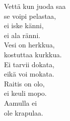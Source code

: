 
            Vettä kun juoda saa \\
            se voipi pelastaa, \\
            ei iske känni, \\
            ei ala ränni. \\
            Vesi on herkkua, \\
            kostuttaa kurkkua. \\
            Ei tarvii dokata, \\
            eikä voi mokata. \\
            Raitis on olo, \\
            ei keuli mopo. \\
            Aamulla ei \\
            ole krapulaa. \\
